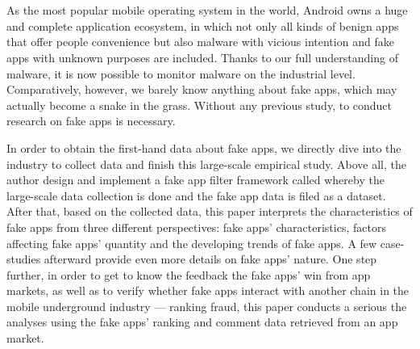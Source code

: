 \newpage


\chapter*{}
\vspace{-5mm}

As the most popular mobile operating system in the world, Android owns a huge and complete application ecosystem, in which not only all kinds of benign apps that offer people convenience but also malware with vicious intention and fake apps with unknown purposes are included.
Thanks to our full understanding of malware, it is now possible to monitor malware on the industrial level.
Comparatively, however, we barely know anything about fake apps, which may actually become a snake in the grass.
Without any previous study, to conduct research on fake apps is necessary.

In order to obtain the first-hand data about fake apps, we directly dive into the industry to collect data and finish this large-scale empirical study.
Above all, the author design and implement a fake app filter framework called \mytool whereby the large-scale data collection is done and the fake app data is filed as a dataset.
After that, based on the collected data, this paper interprets the characteristics of fake apps from three different perspectives: fake apps' characteristics, factors affecting fake apps' quantity and the developing trends of fake apps.
A few case-studies afterward provide even more details on fake apps' nature.
One step further, in order to get to know the feedback the fake apps' win from app markets, as well as to verify whether fake apps interact with another chain in the mobile underground industry --- ranking fraud, this paper conducts a serious the analyses using the fake apps' ranking and comment data retrieved from an app market.

